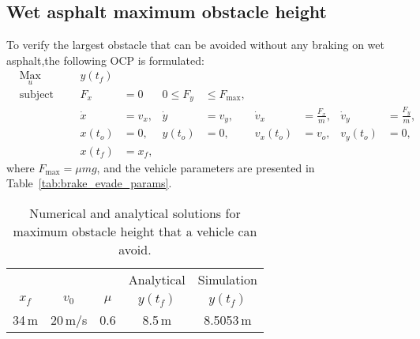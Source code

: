\subsection{Wet asphalt maximum obstacle height}
To verify the largest obstacle that can be avoided without any braking on wet asphalt,the following OCP is formulated:
\begin{align}
    & \underset{u}{\text{Max}}
    & & & y(t_f)\\
%
    & \text{subject to} 
    & & & F_x &= 0 &0 \leq F_y &\leq F_{\text{max}},\\
%
    &&& & \dot x &= v_x, & \dot y &= v_y, & \dot v_x &= \frac{F_x}{m}, & \dot v_y &= \frac{F_y}{m},\\
%
    &&& & x(t_o) &= 0, & y(t_o) &= 0, & v_x(t_o) &= v_o, & v_y(t_o) &= 0,\\
    &&& & x(t_f) &= x_f,
\end{align}
where $F_{\text{max}} = \mu m g$, and the vehicle parameters are presented in Table~\ref{tab:brake_evade_params}.
\begin{table}[h!]
    \centering
    \begin{tabular}{c|c|c|c|c}
        & & & Analytical & Simulation\\
        $x_f$ & $v_0$ & $\mu$ & $y(t_f)$ & $y(t_f)$ \\
        \hline
        34\,m & 20\,m/s & 0.6 & 8.5\,m & 8.5053\,m \\
    \end{tabular}
    \caption{Numerical and analytical solutions for maximum obstacle height that a vehicle can avoid.}
\end{table}
